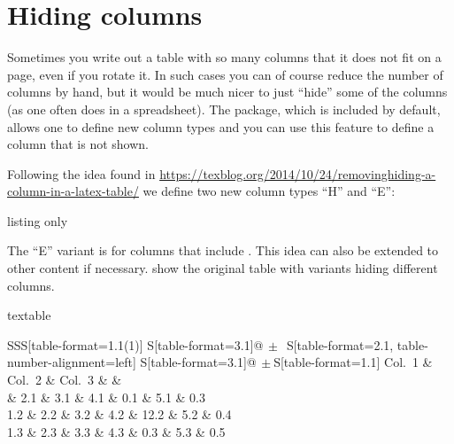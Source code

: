 \section{Hiding columns}
\label{sec:tab:hide}

Sometimes you write out a table with so many columns that it does not fit
on a page, even if you rotate it.
In such cases you can of course reduce the number of columns by hand,
but it would be much nicer to just \enquote{hide} some of the columns
(as one often does in a spreadsheet).
The  package,
which is included by default,
allows one to define new column types
and you can use this feature to define a column that is not shown.

Following the idea found in
\url{https://texblog.org/2014/10/24/removinghiding-a-column-in-a-latex-table/}
we define two new column types \enquote{H} and \enquote{E}:

\begin{tcblisting}{listing only}
\end{tcblisting}

The \enquote{E} variant is for columns that include .
This idea can also be extended to other content if necessary.
 show the original table
with variants hiding different columns.

\begin{table}[htbp]
  \caption{Simple table with columns that we want to hide.}%
  \label{tab:column1}
\begin{tcblisting}{textable}
\centering
\begin{tabular}{SSS[table-format=1.1(1)]
  S[table-format=3.1]@{\(\,\pm\,\)}
  S[table-format=2.1, table-number-alignment=left]
  S[table-format=3.1]@{\(\,\pm\!\!\)}S[table-format=1.1]}
  \toprule
  {Col.\ 1} & {Col.\ 2} & {Col.\ 3} &
   &
   \\
   & 2.1 & 3.1  & 4.1 & 0.1 & 5.1 & 0.3 \\
  1.2 & 2.2 & 3.2  & 4.2 & 12.2 & 5.2 & 0.4 \\
  1.3 & 2.3 & 3.3  & 4.3 & 0.3 & 5.3 & 0.5\\
  \bottomrule
\end{tabular}
\end{tcblisting}
\end{table}


